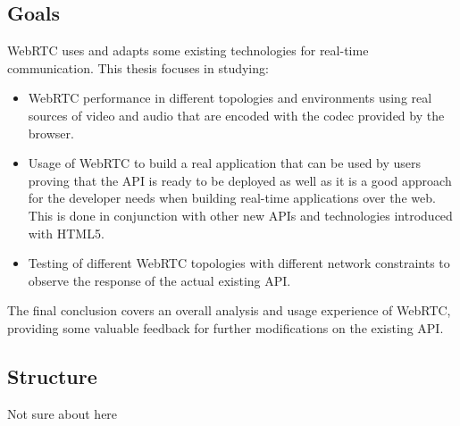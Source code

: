 \subsection{Goals}

WebRTC uses and adapts some existing technologies for real-time communication. This thesis focuses in studying:

\begin{itemize}
	\item WebRTC performance in different topologies and environments using real sources of video and audio that are encoded with the codec provided by the browser.
	
	\item Usage of WebRTC to build a real application that can be used by users proving that the API is ready to be deployed as well as it is a good approach for the developer needs when building real-time applications over the web. This is done in conjunction with other new APIs and technologies introduced with HTML5.
	
	\item Testing of different WebRTC topologies with different network constraints to observe the response of the actual existing API.
\end{itemize}

The final conclusion covers an overall analysis and usage experience of WebRTC, providing some valuable feedback for further modifications on the existing API.

\subsection{Structure}

Not sure about here